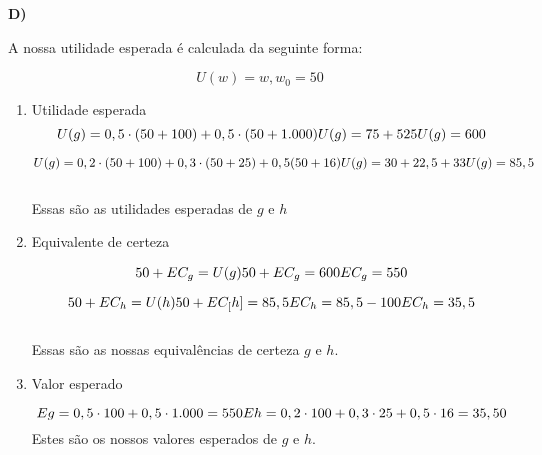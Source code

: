 \begin{flushleft}
\singlespacing

\textbf{D)}

A nossa utilidade esperada é calculada da seguinte forma:

\begin{equation}
U(w) = w ,   w_{0} = 50
\end{equation}

\begin{enumerate}
	\item Utilidade esperada
	\begin{equation}
	U(g) = 0,5 \cdot (50 + 100) + 0,5 \cdot(50 + 1.000)
	$$\\$$
	U(g) = 75 + 525
	$$\\$$
	U(g) = 600
	\end{equation}
	
	\begin{equation}
	U(g) = 0,2 \cdot (50 + 100) + 0,3 \cdot(50 + 25) + 0,5(50 + 16)
	$$\\$$
	U(g) = 30 + 22,5 + 33
	$$\\$$
	U(g) = 85,5
	\end{equation}
	\\ Essas são as utilidades esperadas de $g$ e $h$
	
	\item Equivalente de certeza
	
	\begin{equation}
	50 + EC_{g} = U(g)
	$$\\$$
	50 + EC_{g} = 600
	$$\\$$
	EC_{g} = 550
	\end{equation}
	
	\begin{equation}
	50 + EC_{h} = U(h)
	$$\\$$
	50 + EC_[h] = 85,5
	$$\\$$
	EC_{h} = 85,5 - 100
	$$\\$$
	EC_{h} = 35,5
	\end{equation}
	\\ Essas são as nossas equivalências de certeza $g$ e $h$.
	
	\item Valor esperado
	
	\begin{equation}
	Eg = 0,5 \cdot 100 + 0,5 \cdot 1.000 = 550
	$$\\$$
	Eh = 0,2 \cdot 100 + 0,3 \cdot 25 + 0,5 \cdot 16 = 35,50
	\end{equation}
	Estes são os nossos valores esperados de $g$ e $h$.
	

\end{enumerate}
\end{flushleft}
